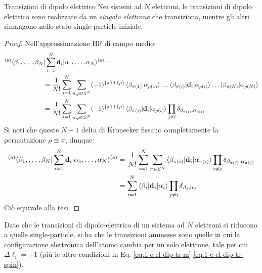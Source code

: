 \begin{proposition}{Transizioni di dipolo elettrico}{}
	Nei sistemi ad $ N $ elettroni, le transizioni di dipolo elettrico sono realizzate da un \textit{singolo elettrone} che transiziona, mentre gli altri rimangono nello stato single-particle iniziale.

	\tcblower

	\begin{proof}
		Nell'approssimazione HF di campo medio:
		\begin{equation*}
			\begin{split}
				& {^\text{(a)}\langle} \beta_1, \dots, \beta_N | \sum_{i = 1}^{N} \mathbf{d}_i | \alpha_1, \dots, \alpha_N {\rangle^\text{(a)}} = \\
				& \qquad \qquad \qquad = \frac{1}{N!} \sum_{i = 1}^{N} \sum_{\pi,\rho \in S^N} (-1)^{\{\pi\} + \{\rho\}} \braket{\beta_{\pi(1)} | \alpha_{\rho(1)}} \dots \braket{\beta_{\pi(i)} | \mathbf{d}_i | \alpha_{\rho(i)}} \dots \braket{\beta_{\pi(N)} | \alpha_{\rho(N)}} \\
				& \qquad \qquad \qquad = \frac{1}{N!} \sum_{i = 1}^{N} \sum_{\pi,\rho \in S^N} (-1)^{\{\pi\} + \{\rho\}} \braket{\beta_{\pi(i)} | \mathbf{d}_i | \alpha_{\rho(i)}} \prod_{j \neq i} \delta_{\beta_{\pi(j)} , \alpha_{\rho(j)}}
			\end{split}
		\end{equation*}
		Si noti che queste $ N - 1 $ delta di Kronecker fissano completamente la permutazione $ \rho \equiv \pi $, dunque:
		\begin{equation*}
			\begin{split}
				{^\text{(a)}\langle} \beta_1, \dots, \beta_N | \sum_{i = 1}^{N} \mathbf{d}_i | \alpha_1, \dots, \alpha_N {\rangle^\text{(a)}}
				& = \frac{1}{N!} \sum_{i = 1}^{N} \sum_{\pi \in S^N} \braket{\beta_{\pi(i)} | \mathbf{d}_i | \alpha_{\pi(i)}} \prod_{i \neq j} \delta_{\beta_{\pi(j)} , \alpha_{\pi(j)}} \\
				& = \sum_{i = 1}^{N} \braket{\beta_i | \mathbf{d}_i | \alpha_i} \prod_{j \neq i} \delta_{\beta_j , \alpha_j}
			\end{split}
		\end{equation*}
		Ciò equivale alla tesi.
	\end{proof}
\end{proposition}

Dato che le transizioni di dipolo-elettrico di un sistema ad $ N $ elettroni si riducono a quelle single-particle, si ha che le transizioni ammesse sono quelle in cui la configurazione elettronica dell'atomo cambia per un solo elettrone, tale per cui $ \Delta \ell_i = \pm 1 $ (più le altre condizioni in Eq. \ref{eq:1-e-el-dip-tr-m}-\ref{eq:1-e-el-dip-tr-spin}).

